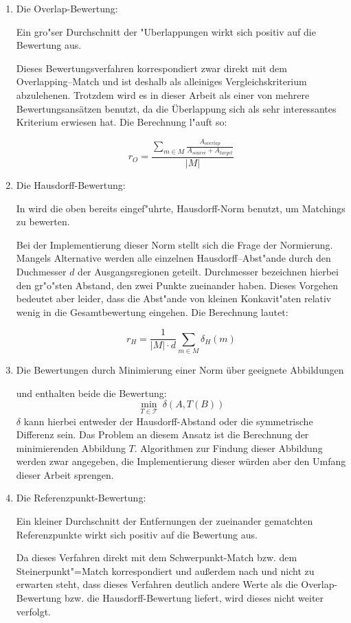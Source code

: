 \begin{enumerate}
\item Die Overlap-Bewertung: 

Ein gro"ser Durchschnitt der "Uberlappungen wirkt sich positiv auf die Bewertung aus.

Dieses Bewertungsverfahren korrespondiert zwar direkt mit dem Overlapping--Match und ist deshalb als alleiniges Vergleichskriterium abzulehenen. Trotzdem wird es in dieser Arbeit als einer von mehrere Bewertungsansätzen benutzt, da die Überlappung sich als sehr interessantes Kriterium erwiesen hat. Die Berechnung l"auft so:

$$r_O=\frac{\sum_{m\in M} \frac{A_{overlap}}{A_{source}+A_{target}}}{|M|}$$

\item Die Hausdorff-Bewertung:

In \cite{AAR} wird die oben bereits eingef"uhrte, Hausdorff-Norm benutzt, um Matchings zu bewerten. 

Bei der Implementierung dieser Norm stellt sich die Frage der Normierung. Mangels Alternative werden alle einzelnen Hausdorff--Abst"ande durch den Duchmesser $d$ der Ausgangsregionen geteilt.  Durchmesser bezeichnen hierbei den gr"o"sten Abstand, den zwei Punkte zueinander haben. Dieses Vorgehen bedeutet aber leider, dass die Abst"ande von kleinen Konkavit"aten relativ wenig in die Gesamtbewertung eingehen. Die Berechnung lautet:

$$r_H=\frac{1}{|M| \cdot d}\sum_{m\in M}\delta_H(m)$$

\item Die Bewertungen durch Minimierung einer Norm über geeignete Abbildungen

\cite{AAR} und \cite{AFRW} enthalten beide die Bewertung:
$$\min_{T\in\mathcal{T}}\: \delta(A,T(B))$$
$\delta$ kann hierbei entweder der Hausdorff-Abstand oder die symmetrische Differenz sein. Das Problem an diesem Ansatz ist die Berechnung der minimierenden Abbildung $T$. Algorithmen zur Findung dieser Abbildung werden zwar angegeben, die Implementierung dieser würden aber den Umfang dieser Arbeit sprengen.

\item Die Referenzpunkt-Bewertung:

Ein kleiner Durchschnitt der Entfernungen der zueinander gematchten Referenzpunkte wirkt sich positiv auf die Bewertung aus.

Da dieses Verfahren direkt mit dem Schwerpunkt-Match bzw. dem Steinerpunkt"=Match korrespondiert und außerdem nach \cite{AFRW} und \cite{AAR} nicht zu erwarten steht, dass dieses Verfahren deutlich andere Werte als die Overlap-Bewertung bzw. die Hausdorff-Bewertung liefert, wird dieses nicht weiter verfolgt.


\end{enumerate}
